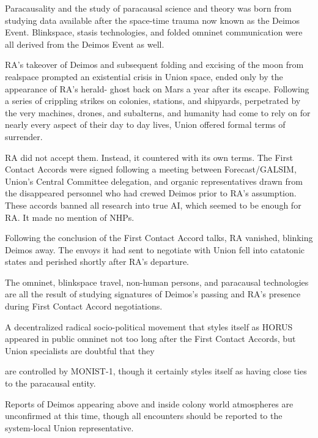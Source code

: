Paracausality and the study of paracausal science and theory was born from studying data  
available after the space-time trauma now known as the Deimos Event. Blinkspace, stasis  
technologies, and folded omninet communication were all derived from the Deimos Event as  
well.  
 

RA’s takeover of Deimos and subsequent folding and excising of the moon from realspace  
prompted an existential crisis in Union space, ended only by the appearance of RA’s herald- 
ghost back on Mars a year after its escape. Following a series of crippling strikes on colonies,  
stations, and shipyards, perpetrated by the very machines, drones, and subalterns, and humanity  
had come to rely on for nearly every aspect of their day to day lives, Union offered formal terms  
of surrender. 
 

RA did not accept them. Instead, it countered with its own terms. The First Contact Accords  
were signed following a meeting between Forecast/GALSIM, Union’s Central Committee  
delegation, and organic representatives drawn from the disappeared personnel who had crewed  
Deimos prior to RA’s assumption. These accords banned all research into true AI, which seemed  
to be enough for RA. It made no mention of NHPs. 
 

Following the conclusion of the First Contact Accord talks, RA vanished, blinking Deimos away.  
The envoys it had sent to negotiate with Union fell into catatonic states and perished shortly after  
RA’s departure.  
 

The omninet, blinkspace travel, non-human persons, and paracausal technologies are all the  
result of studying signatures of Deimos’s passing and RA’s presence during First Contact Accord  
negotiations. 
 

A decentralized radical socio-political movement that styles itself as HORUS appeared in public  
omninet not too long after the First Contact Accords, but Union specialists are doubtful that they  

                                                                                                                   


are controlled by MONIST-1, though it certainly styles itself as having close ties to the paracausal  
entity. 
 

Reports of Deimos appearing above and inside colony world atmospheres are unconfirmed at  
this time, though all encounters should be reported to the system-local Union representative.
 
